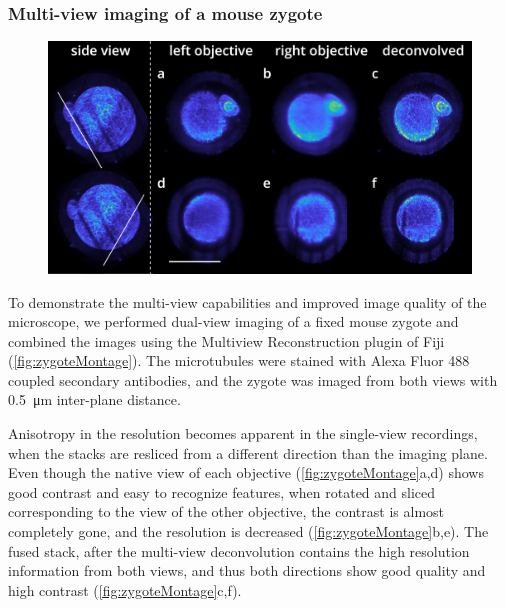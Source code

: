   \subsubsection{Multi-view imaging of a mouse zygote}
    \begin{figure}[ptb]
      \centering
      \includegraphics[width=1\textwidth]{zygoteMontage}
      \label{fig:zygoteMontage}
    \end{figure}

    To demonstrate the multi-view capabilities and improved image quality of the microscope, we performed dual-view imaging of a fixed mouse zygote and combined the images using the Multiview Reconstruction \cite{preibisch_efficient_2014} plugin of Fiji (\autoref{fig:zygoteMontage}). The microtubules were stained with Alexa Fluor 488 coupled secondary antibodies, and the zygote was imaged from both views with \SI{0.5}{\micro m} inter-plane distance.

    Anisotropy in the resolution becomes apparent in the single-view recordings, when the stacks are resliced from a different direction than the imaging plane. Even though the native view of each objective (\autoref{fig:zygoteMontage}a,d) shows good contrast and easy to recognize features, when rotated and sliced corresponding to the view of the other objective, the contrast is almost completely gone, and the resolution is decreased (\autoref{fig:zygoteMontage}b,e). The fused stack, after the multi-view deconvolution contains the high resolution information from both views, and thus both directions show good quality and high contrast (\autoref{fig:zygoteMontage}c,f).




